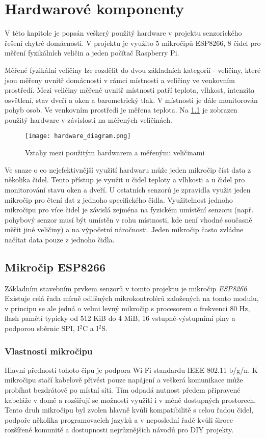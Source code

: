 \chapter{Hardwarové komponenty} \label{chap:hardware}
V této kapitole je popsán veškerý použitý hardware v projektu senzorického řešení chytré domácnosti. V projektu je využito 5 mikročipů ESP8266, 8 čidel pro měření fyzikálních veličin a jeden počítač Raspberry Pi. 

Měřené fyzikální veličiny lze rozdělit do dvou základních kategorií - veličiny, které jsou měřeny uvnitř domácnosti v rámci místnosti a veličiny ve venkovním prostředí. Mezi veličiny měřené uvnitř místnosti patří teplota, vlhkost, intenzita osvětlení, stav dveří a oken a barometrický tlak. V místnosti je dále monitorován pohyb osob. Ve venkovním prostředí je měřena teplota. Na \cref{fig:hardware_diagram} je zobrazen použitý hardware v závislosti na měřených veličinách. 

\begin{figure}[H]
  \centering
  \texttt{[image: hardware\_diagram.png]}
  \caption{Vztahy mezi použitým hardwarem a měřenými veličinami}
  \label{fig:hardware_diagram}
\end{figure}

Ve snaze o co nejefektivnější využití hardwaru může jeden mikročip číst data z několika čidel. Tento přístup je využit u čidel teploty a vlhkosti a u čidel pro monitorování stavu oken a dveří. U ostatních senzorů je zpravidla využit jeden mikročip pro čtení dat z jednoho specifického čidla. Využitelnost jednoho mikročipu pro více čidel je závislá zejména na fyzickém umístění senzoru (např. pohybový senzor musí být umístěn v rohu místnosti, kde není vhodné současně měřit jiné veličiny) a na výpočetní náročnosti. Jeden mikročip často zvládne načítat data pouze z jednoho čidla.

\section{Mikročip ESP8266} \label{sec:esp8266}

Základním stavebním prvkem senzorů v tomto projektu je mikročip \textit{ESP8266}. Existuje celá řada mírně odlišných mikrokontrolérů založených na tomto modulu, v principu se ale jedná o velmi levný mikročip s procesorem o frekvenci 80 Hz, flash pamětí typicky od 512 KiB do 4 MiB, 16 vstupně-výstupními piny a podporou sběrnic SPI,  I$^2$C a I$^2$S. \cite{ESP8266:Datasheet}

\subsection*{Vlastnosti mikročipu}
Hlavní předností tohoto čipu je podpora Wi-Fi standardu IEEE 802.11 b/g/n. K mikročipu stačí kabelově přivést pouze napájení a veškerá komunikace může probíhat bezdrátově po místní síti. Tím odpadá nutnost předem připravené kabeláže v domě a rozšiřují se možnosti využití i v méně dostupných prostorech. Tento druh mikročipu byl zvolen hlavně kvůli kompatibilitě s celou řadou čidel, podpoře několika programovacích jazyků a v neposlední řadě kvůli široce rozšířené komunitě a dostupnosti nejrůznějších návodů pro DIY projekty.


